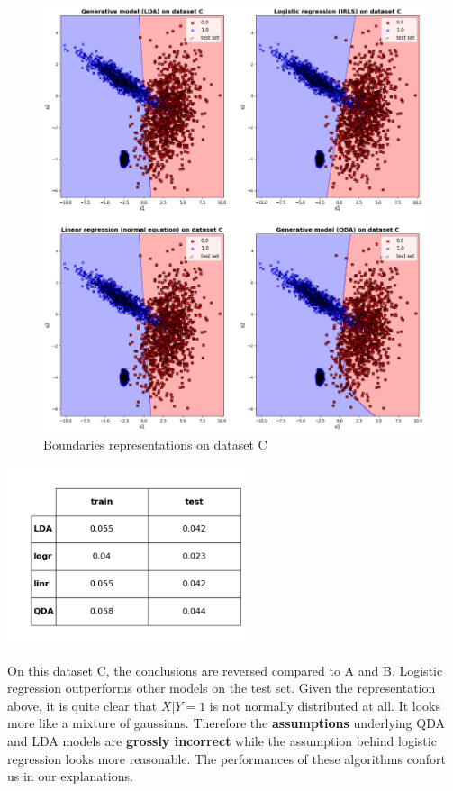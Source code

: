\documentclass[a4paper, 11pt]{article}
\begin{document}
\newpage

\begin{figure}[!h]
\includegraphics[width=16cm]{dataset_C_crop.png}
\caption{Boundaries representations on dataset C}
\end{figure}

\noindent\begin{minipage}[b]{0.5\linewidth}
\centering
\includegraphics[width=7cm]{dataset_C_table.png}
\end{minipage}%
\hfill
\begin{minipage}[b]{0.5\linewidth}
On this dataset C, the conclusions are reversed compared to A and B. Logistic regression outperforms other models on the
test set. Given the representation above, it is quite clear that $X|Y=1$ is not normally distributed at all. It looks
more like a mixture of gaussians. Therefore the \textbf{assumptions} underlying QDA and LDA models are \textbf{grossly 
incorrect} while the assumption behind logistic regression looks more reasonable. The performances of these algorithms 
confort us in our explanations. 
\end{minipage}
\end{document}
